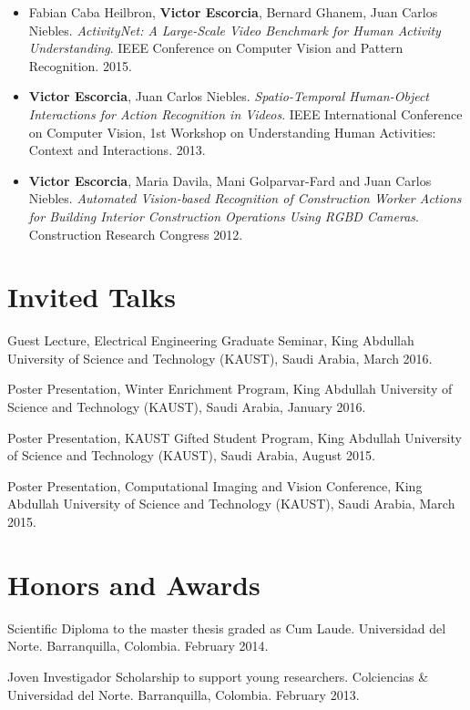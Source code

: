 \documentclass[margin]{res}
\begin{document}
\begin{resume}
\begin{itemize}
\item Fabian Caba Heilbron, \textbf{Victor Escorcia}, Bernard Ghanem, Juan Carlos
Niebles.
\textit{ActivityNet: A Large-Scale Video Benchmark for Human Activity
Understanding}.
IEEE Conference on Computer Vision and Pattern Recognition.
2015.
\smallskip

\item \textbf{Victor Escorcia}, Juan Carlos Niebles.
\textit{Spatio-Temporal Human-Object Interactions for Action Recognition
in Videos}.
IEEE International Conference on Computer Vision, 1st Workshop on
Understanding Human Activities: Context and Interactions. 2013.
\smallskip

\item \textbf{Victor Escorcia}, Maria Davila, Mani Golparvar-Fard and
Juan Carlos Niebles.
\textit{Automated Vision-based Recognition of Construction Worker
Actions for Building Interior Construction Operations Using RGBD Cameras}.
Construction Research Congress 2012.

\end{itemize}
               
\section{Invited Talks}
Guest Lecture, Electrical Engineering Graduate Seminar, King Abdullah University of Science and Technology (KAUST), Saudi Arabia, March 2016.

Poster Presentation, Winter Enrichment Program, King Abdullah University of Science and Technology (KAUST), Saudi Arabia, January 2016.

Poster Presentation, KAUST Gifted Student Program, King Abdullah University of Science and Technology (KAUST), Saudi Arabia, August 2015.

Poster Presentation, Computational Imaging and Vision Conference, King Abdullah University of Science and Technology (KAUST), Saudi Arabia, March 2015.

\section{Honors and Awards}
Scientific Diploma to the master thesis graded as Cum Laude.
Universidad del Norte. Barranquilla, Colombia. February 2014.

Joven Investigador Scholarship to support young researchers.
Colciencias \& Universidad del Norte. Barranquilla, Colombia. February 2013.


\end{resume}
\end{document}
